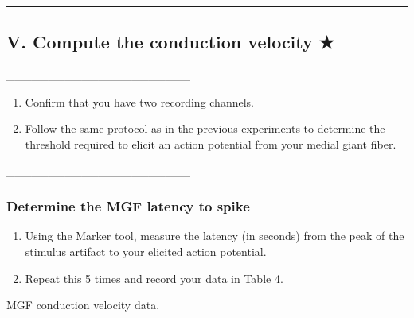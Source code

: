 \documentclass[letterpaper,10pt,english]{jupyterBook}
\begin{document}
\bigskip\hrule\bigskip



\subsection{V. Compute the conduction velocity ★}
\label{\detokenize{Earthworm:v-compute-the-conduction-velocity}}
\sphinxAtStartPar
{}

\sphinxAtStartPar
{} \_\_\_\_\_\_\_\_\_\_\_\_\_\_\_\_\_\_\_\_\_\_
\begin{enumerate}
%
\item {} 
\sphinxAtStartPar
{} Confirm that you have two recording channels.

\item {} 
\sphinxAtStartPar
Follow the same protocol as in the previous experiments to determine the threshold required to elicit an action potential from your medial giant fiber.

\end{enumerate}

\sphinxAtStartPar
{} \_\_\_\_\_\_\_\_\_\_\_\_\_\_\_\_\_\_\_\_\_\_


\subsubsection{Determine the MGF latency to spike}
\label{\detokenize{Earthworm:determine-the-mgf-latency-to-spike}}\begin{enumerate}
%
\item {} 
\sphinxAtStartPar
Using the Marker tool, measure the latency (in seconds) from the peak of the stimulus artifact to your elicited action potential.

\item {} 
\sphinxAtStartPar
Repeat this 5 times and record your data in Table 4.

\end{enumerate}

\sphinxAtStartPar
{} MGF conduction velocity data.
\end{document}
